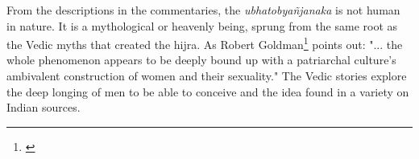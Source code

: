 From the descriptions in the commentaries, the {\em ubhatob­yañ­janaka} is not human in nature. It is a mythological or heavenly being, sprung from the same root as the Vedic myths that created the hijra. As Robert Goldman\footnote{\cite{goldman}} points out: "... the whole phenomenon appears to be deeply bound up with a patriarchal culture's ambivalent construction of women and their sexuality." The Vedic stories explore the deep longing of men to be able to conceive and the idea found in a variety on Indian sources.

